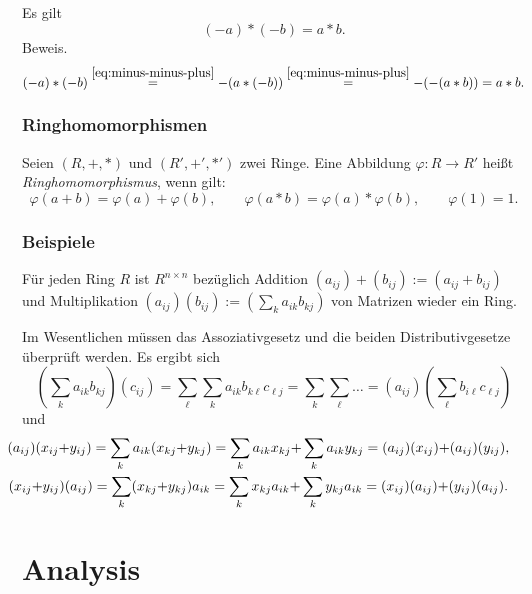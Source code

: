 \documentclass[a4paper,11pt,fleqn,twoside]{scrartcl}
\numberwithin{equation}{section}
\newcommand{\strong}[1]{{\normalfont\sffamily\bfseries #1}}
\newenvironment{Definition}{\par\noindent\strong{Definition.}}{\par}
\newcommand{\emdef}[1]{\emph{#1}}
\begin{document}
Es gilt
\begin{equation}
(-a)*(-b) = a*b.
\end{equation}
Beweis.
\begin{equation}
(-a)*(-b) \stackrel{\eqref{eq:minus-minus-plus}}= -(a*(-b))
\stackrel{\eqref{eq:minus-minus-plus}}= -(-(a*b)) = a*b.
\end{equation}
\subsubsection{Ringhomomorphismen}
\begin{Definition}
Seien $(R,+,*)$ und $(R',+',*')$ zwei Ringe. Eine Abbildung
$\varphi\colon R\to R'$ heißt \emdef{Ringhomomorphismus},
wenn gilt:
\begin{equation}
\varphi(a+b) = \varphi(a)+\varphi(b),\qquad
\varphi(a*b) = \varphi(a)*\varphi(b),\qquad
\varphi(1) = 1.
\end{equation}
\end{Definition}
\subsubsection{Beispiele}
Für jeden Ring $R$ ist $R^{n\times n}$ bezüglich
Addition $(a_{ij})+(b_{ij}):=(a_{ij}+b_{ij})$
und Multiplikation $(a_{ij})(b_{ij}):=(\sum_k a_{ik}b_{kj})$
von Matrizen wieder ein Ring.

Im Wesentlichen müssen das Assoziativgesetz und die beiden
Distributivgesetze überprüft werden. Es ergibt sich
\begin{equation}
(\sum_k a_{ik}b_{kj})(c_{ij})
= \sum_\ell \sum_k a_{ik}b_{k\ell}c_{\ell j}
= \sum_k \sum_{\ell} \ldots
= (a_{ij})(\sum_\ell b_{i\ell}c_{\ell j})
\end{equation}
und
\begin{gather}
\hspace{-2.2em}(a_{ij})(x_{ij}{+}y_{ij})
= \sum_k a_{ik} (x_{kj}{+}y_{kj})
= \sum_k a_{ik} x_{kj}{+}\sum_k a_{ik}y_{kj}
= (a_{ij})(x_{ij}){+}(a_{ij})(y_{ij}),\\
\hspace{-2.2em}(x_{ij}{+}y_{ij})(a_{ij})
= \sum_k (x_{kj}{+}y_{kj})a_{ik} 
= \sum_k x_{kj}a_{ik}{+}\sum_k y_{kj}a_{ik}
= (x_{ij})(a_{ij}){+}(y_{ij})(a_{ij}).
\end{gather}

\section{Analysis}
\end{document}
